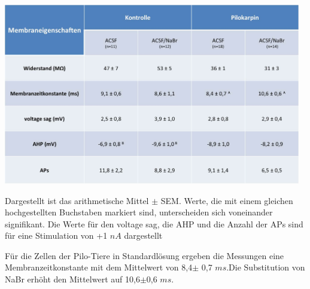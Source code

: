 \documentclass[a4paper,11pt]{report}
\begin{document}
{\begin{table}[H]
\begin{center}
\includegraphics[width= 13cm]{Abbildungen/Membraneigenschaften/tabelle_membraneigenschaften.jpg}
\caption{Dargestellt ist das arithmetische Mittel $\pm$ SEM. Werte, die mit einem gleichen hochgestellten Buchstaben markiert sind, unterscheiden sich voneinander signifikant. Die Werte für den voltage sag, die AHP und die Anzahl der APs sind für eine Stimulation von +1 $nA$ dargestellt}
\end{center}
\end{table}

Für die Zellen der Pilo-Tiere in Standardlösung ergeben die Messungen eine Membranzeitkonstante mit dem Mittelwert von 8,4$\pm$ 0,7 $ms$.Die Substitution von NaBr erhöht den Mittelwert auf 10,6$\pm$0,6 $ms$.\\



}
\end{document}
